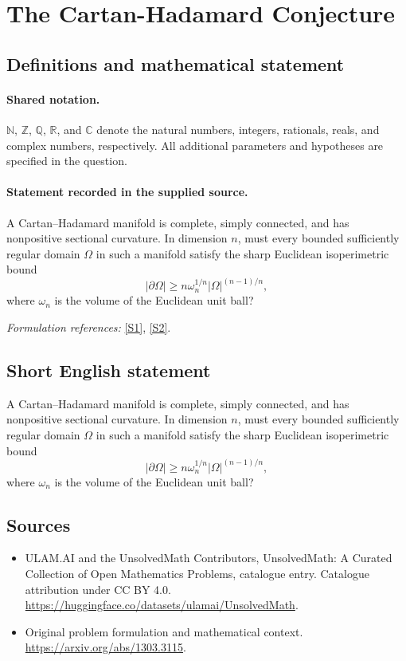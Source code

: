 \documentclass[11pt]{article}
\newcommand{\sref}[2]{\hyperlink{source:#1:#2}{[S#2]}}
\begin{document}
\section{The Cartan-Hadamard Conjecture}\label{statement}

\subsection{Definitions and mathematical statement}

\paragraph{Shared notation.}$\mathbb N$, $\mathbb Z$, $\mathbb Q$, $\mathbb R$, and $\mathbb C$ denote the natural numbers, integers, rationals, reals, and complex numbers, respectively. All additional parameters and hypotheses are specified in the question.


\paragraph{Statement recorded in the supplied source.}
A Cartan--Hadamard manifold is complete, simply connected, and has nonpositive sectional curvature. In dimension $n$, must every bounded sufficiently regular domain $\Omega$ in such a manifold satisfy the sharp Euclidean isoperimetric bound
\[|\partial\Omega|\geq n\omega_n^{1/n}|\Omega|^{(n-1)/n},\]
where $\omega_n$ is the volume of the Euclidean unit ball?
\par\smallskip\textit{Formulation references:} \sref{statement}{1}, \sref{statement}{2}.
\subsection{Short English statement}
A Cartan--Hadamard manifold is complete, simply connected, and has nonpositive sectional curvature. In dimension $n$, must every bounded sufficiently regular domain $\Omega$ in such a manifold satisfy the sharp Euclidean isoperimetric bound
\[|\partial\Omega|\geq n\omega_n^{1/n}|\Omega|^{(n-1)/n},\]
where $\omega_n$ is the volume of the Euclidean unit ball?
\subsection{Sources}
\begin{itemize}
\item[\hypertarget{source:statement:1}{S1}] ULAM.AI and the UnsolvedMath Contributors, UnsolvedMath: A Curated Collection of Open Mathematics Problems, catalogue entry. Catalogue attribution under CC BY 4.0.
\url{https://huggingface.co/datasets/ulamai/UnsolvedMath}.
\item[\hypertarget{source:statement:2}{S2}] Original problem formulation and mathematical context.
\url{https://arxiv.org/abs/1303.3115}.
\end{itemize}
\label{end:statement}
\end{document}
